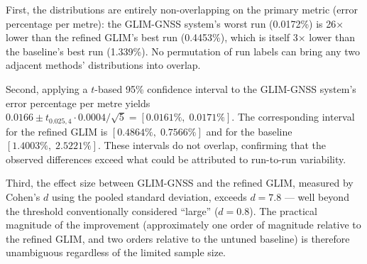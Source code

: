 First, the distributions are entirely non-overlapping on the primary metric (error percentage per metre): the GLIM-GNSS system's worst run (0.0172\%) is 26$\times$ lower than the refined GLIM's best run (0.4453\%), which is itself 3$\times$ lower than the baseline's best run (1.339\%). No permutation of run labels can bring any two adjacent methods' distributions into overlap.

Second, applying a $t$-based 95\% confidence interval to the GLIM-GNSS system's error percentage per metre yields $0.0166 \pm t_{0.025,4} \cdot 0.0004/\sqrt{5} = [0.0161\%,\; 0.0171\%]$. The corresponding interval for the refined GLIM is $[0.4864\%,\; 0.7566\%]$ and for the baseline $[1.4003\%,\; 2.5221\%]$. These intervals do not overlap, confirming that the observed differences exceed what could be attributed to run-to-run variability.

Third, the effect size between GLIM-GNSS and the refined GLIM, measured by Cohen's $d$ using the pooled standard deviation, exceeds $d = 7.8$ --- well beyond the threshold conventionally considered ``large'' ($d = 0.8$). The practical magnitude of the improvement (approximately one order of magnitude relative to the refined GLIM, and two orders relative to the untuned baseline) is therefore unambiguous regardless of the limited sample size.